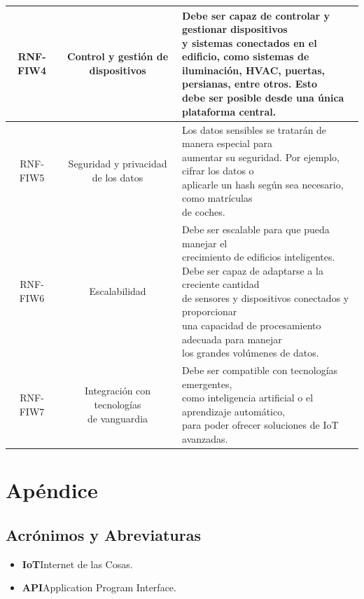 \documentclass[12pt, a4paper, twoside]{article}
\newcommand\ttab{\tab \hspace{-5cm}}
\begin{document}
{\begin{longtable}{ |c|c|l| }
  RNF-FIW4 & Control y gestión de dispositivos
  & \makecell[l]{
    Debe ser capaz de controlar y gestionar dispositivos\\
    y sistemas conectados en el edificio, como sistemas de\\
    iluminación, HVAC, puertas, persianas, entre otros. Esto\\
    debe ser posible desde una única plataforma central.
  } \\ \hline

  RNF-FIW5 & Seguridad y privacidad de los datos
  & \makecell[l]{
    Los datos sensibles se tratarán de manera especial para\\
    aumentar su seguridad. Por ejemplo, cifrar los datos o\\
    aplicarle un hash según sea necesario, como matrículas\\
    de coches.
  } \\ \hline

  RNF-FIW6 & Escalabilidad
  & \makecell[l]{
    Debe ser escalable para que pueda manejar el\\
    crecimiento de edificios inteligentes.\\
    Debe ser capaz de adaptarse a la creciente cantidad\\
    de sensores y dispositivos conectados y proporcionar\\
    una capacidad de procesamiento adecuada para manejar\\
    los grandes volúmenes de datos.
  } \\ \hline

  RNF-FIW7 & \makecell[c]{Integración con tecnologías\\ de vanguardia}
  & \makecell[l]{
    Debe ser compatible con tecnologías emergentes,\\
    como inteligencia artificial o el aprendizaje automático,\\
    para poder ofrecer soluciones de IoT avanzadas.
  } \\ \hline

\end{longtable}
}
\section{Apéndice}
\subsection{Acrónimos y Abreviaturas}
\begin{itemize}
    \item \textbf{IoT}\ttab Internet de las Cosas.
    \item \textbf{API}\ttab Application Program Interface.
  \end{itemize}
\end{document}
